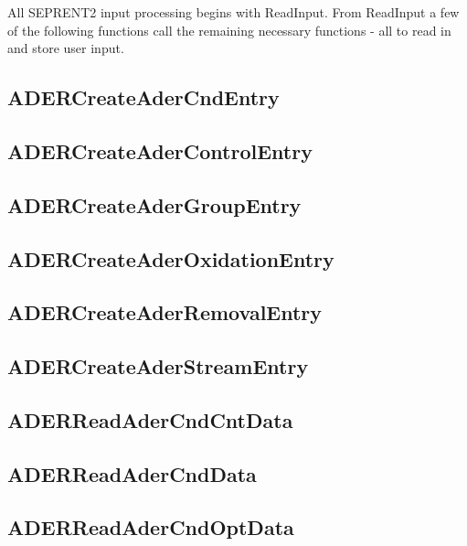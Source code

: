 All SEPRENT2 input processing begins with ReadInput. From ReadInput a few of the
following functions call the remaining necessary functions - all to read in and
store user input.\\

\subsection{ADERCreateAderCndEntry}


\subsection{ADERCreateAderControlEntry}


\subsection{ADERCreateAderGroupEntry}


\subsection{ADERCreateAderOxidationEntry}


\subsection{ADERCreateAderRemovalEntry}


\subsection{ADERCreateAderStreamEntry}


\subsection{ADERReadAderCndCntData}


\subsection{ADERReadAderCndData}


\subsection{ADERReadAderCndOptData}


